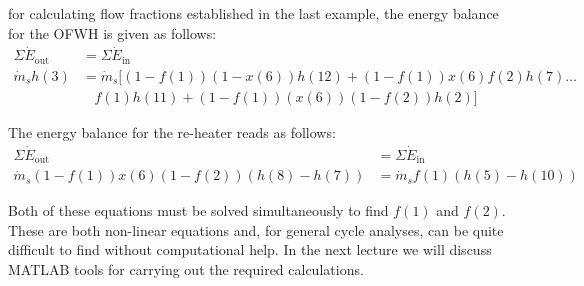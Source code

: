  for calculating flow fractions established in the last example, the energy balance for the OFWH is given as follows:
\begin{align*}
\Sigma \dot{E}_{\text{out}} &= \Sigma \dot{E}_{\text{in}} \\
\dot{m}_s h(3) &= \dot{m}_s [(1-f(1))(1-x(6))h(12) + (1-f(1))x(6)f(2)h(7)\dots \\
               & \ \ \ \ f(1)h(11) + (1-f(1))(x(6))(1-f(2))h(2) ]
\end{align*}

The energy balance for the re-heater reads as follows:
\begin{align*}
\Sigma \dot{E}_{\text{out}} &= \Sigma \dot{E}_{\text{in}} \\
\dot{m}_s(1-f(1))x(6)(1-f(2))(h(8)-h(7))&=\dot{m}_s f(1)(h(5)-h(10))
\end{align*}

Both of these equations must be solved simultaneously to find $f(1)$ and $f(2)$.  These are both non-linear equations and, for general cycle analyses, can be quite difficult to find without computational help.  In the next lecture we will discuss MATLAB tools for carrying out the required calculations.



